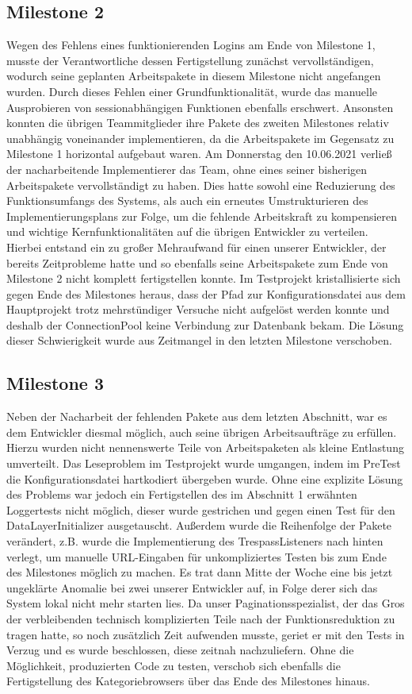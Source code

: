 \documentclass{article}
\begin{document}
\subsection{Milestone 2}
Wegen des Fehlens eines funktionierenden Logins am Ende von Milestone 1, musste der Verantwortliche dessen Fertigstellung zunächst vervollständigen, wodurch seine geplanten Arbeitspakete in diesem Milestone nicht angefangen wurden. Durch dieses Fehlen einer Grundfunktionalität, wurde das manuelle Ausprobieren von sessionabhängigen Funktionen ebenfalls erschwert. Ansonsten konnten die übrigen Teammitglieder ihre Pakete des zweiten Milestones relativ unabhängig voneinander implementieren, da die Arbeitspakete im Gegensatz zu Milestone 1 horizontal aufgebaut waren. Am Donnerstag den 10.06.2021 verließ der nacharbeitende Implementierer das Team, ohne eines seiner bisherigen Arbeitspakete vervollständigt zu haben. Dies hatte sowohl eine Reduzierung des Funktionsumfangs des Systems, als auch ein erneutes Umstrukturieren des Implementierungsplans zur Folge, um die fehlende Arbeitskraft zu kompensieren und wichtige Kernfunktionalitäten auf die übrigen Entwickler zu verteilen. Hierbei entstand ein zu großer Mehraufwand für einen unserer Entwickler, der bereits Zeitprobleme hatte und so ebenfalls seine Arbeitspakete zum Ende von Milestone 2 nicht komplett fertigstellen konnte. Im Testprojekt kristallisierte sich gegen Ende des Milestones heraus, dass der Pfad zur Konfigurationsdatei aus dem Hauptprojekt trotz mehrstündiger Versuche nicht aufgelöst werden konnte und deshalb der ConnectionPool keine Verbindung zur Datenbank bekam. Die Lösung dieser Schwierigkeit wurde aus Zeitmangel in den letzten Milestone verschoben.
 
\subsection{Milestone 3}
Neben der Nacharbeit der fehlenden Pakete aus dem letzten Abschnitt, war es dem Entwickler diesmal möglich, auch seine übrigen Arbeitsaufträge zu erfüllen. Hierzu wurden nicht nennenswerte Teile von Arbeitspaketen als kleine Entlastung umverteilt. Das Leseproblem im Testprojekt wurde umgangen, indem im PreTest die Konfigurationsdatei hartkodiert übergeben wurde. Ohne eine explizite Lösung des Problems war jedoch ein Fertigstellen des im Abschnitt 1 erwähnten Loggertests nicht möglich, dieser wurde gestrichen und gegen einen Test für den DataLayerInitializer ausgetauscht. Außerdem wurde die Reihenfolge der Pakete verändert, z.B. wurde die Implementierung des TrespassListeners nach hinten verlegt, um manuelle URL-Eingaben für unkompliziertes Testen bis zum Ende des Milestones möglich zu machen. Es trat dann Mitte der Woche eine bis jetzt ungeklärte Anomalie bei zwei unserer Entwickler auf, in Folge derer sich das System lokal nicht mehr starten lies. Da unser Paginationsspezialist, der das Gros der verbleibenden technisch komplizierten Teile nach der Funktionsreduktion zu tragen hatte, so noch zusätzlich Zeit aufwenden musste, geriet er mit den Tests in Verzug und es wurde beschlossen, diese zeitnah nachzuliefern. Ohne die Möglichkeit, produzierten Code zu testen, verschob sich ebenfalls die Fertigstellung des Kategoriebrowsers über das Ende des Milestones hinaus. 
\end{document}
